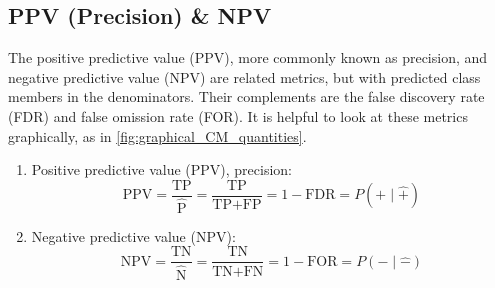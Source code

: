 \subsection{PPV (Precision) \& NPV}
\label{ml_general:eval:PPV_NPV}

The positive predictive value (PPV), more commonly known as precision, and negative predictive value (NPV)
are related metrics, but with predicted class members in the denominators.
Their complements are the false discovery rate (FDR) and false omission rate (FOR).
It is helpful to look at these metrics graphically, as in \cref{fig:graphical_CM_quantities}.

\begin{enumerate}[noitemsep]
  \item Positive predictive value (PPV), \ie precision:
\begin{equation} \label{eq:PPV}
\text{PPV} = \frac{\text{TP}}{\hat{\text{P}}} = \frac{\text{TP}}{\text{TP}+\text{FP}} = 1 - \text{FDR} = P\left(+ \mid \hat{+} \right)
\end{equation}

  \item Negative predictive value (NPV):
\begin{equation} \label{eq:NPV}
\text{NPV} = \frac{\text{TN}}{\hat{\text{N}}} = \frac{\text{TN}}{\text{TN}+\text{FN}} = 1 - \text{FOR} = P\left(- \mid \hat{-} \right)
\end{equation}
\end{enumerate}

